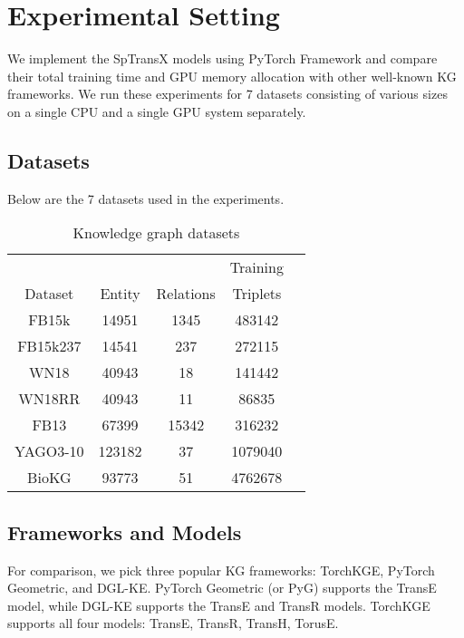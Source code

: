 \section{Experimental Setting}
We implement the SpTransX models using PyTorch Framework and compare their total training time and GPU memory allocation with other well-known KG frameworks. We run these experiments for 7 datasets consisting of various sizes on a single CPU and a single GPU system separately. 

\subsection{Datasets}
Below are the 7 datasets used in the experiments.
    \begin{table}[h]
\caption{Knowledge graph datasets}
\label{table:datasets}
\vskip 0.15in
\begin{center}
\begin{small}
\begin{sc}
\begin{tabular}{ccccc}
\toprule
  &     &    & Training \\
  Dataset      &   Entity          &   Relations          & Triplets \\
\midrule
FB15k    & 14951  & 1345  & 483142  \\
FB15k237 & 14541  & 237   & 272115  \\
WN18     & 40943  & 18    & 141442  \\
WN18RR   & 40943  & 11    & 86835  \\                    
FB13     & 67399  & 15342 & 316232  \\
YAGO3-10 & 123182 & 37    & 1079040 \\
BioKG    & 93773  & 51    & 4762678 \\    
\bottomrule
\end{tabular}
\end{sc}
\end{small}
\end{center}
\vskip -0.1in
\end{table}
\subsection{Frameworks and Models}
\label{fw-models}
For comparison, we pick three popular KG frameworks: TorchKGE, PyTorch Geometric, and DGL-KE. PyTorch Geometric (or PyG) supports the TransE model, while DGL-KE supports the TransE and TransR models. TorchKGE supports all four models: TransE, TransR, TransH, TorusE.
